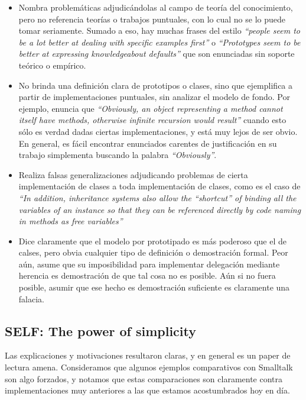 \documentclass[a4paper,10pt]{article}
\begin{document}
\begin{itemize}
	\item Nombra problemáticas adjudicándolas al campo de teoría del conocimiento, pero no referencia teorías o trabajos puntuales, con lo cual no se lo puede tomar seriamente. Sumado a eso, hay muchas frases del estilo \textit{``people seem to be a lot better at dealing with specific examples first''} o \textit{``Prototypes seem to be better at expressing knowledgeabout defaults''} que son enunciadas sin soporte teórico o empírico.
	\item No brinda una definición clara de prototipos o clases, sino que ejemplifica a partir de implementaciones puntuales, sin analizar el modelo de fondo. Por ejemplo, enuncia que \textit{``Obviously, an object representing a method cannot itself have methods, otherwise infinite recursion would result''} cuando esto sólo es verdad dadas ciertas implementaciones, y está muy lejos de ser obvio. En general, es fácil encontrar enunciados carentes de justificación en su trabajo simplementa buscando la palabra \textit{``Obviously''}.
  \item Realiza falsas generalizaciones adjudicando problemas de cierta implementación de clases a toda implementación de clases, como es el caso de \textit{``In addition, inheritance systems also allow the “shortcut” of binding all the variables of an instance so that they can be referenced directly by code naming in methods as free variables''}
  \item Dice claramente que el modelo por prototipado es más poderoso que el de calses, pero obvia cualquier tipo de definición o demostración formal. Peor aún, asume que su imposibilidad para implementar delegación mediante herencia es demostración de que tal cosa no es posible. Aún si no fuera posible, asumir que ese hecho es demostración suficiente es claramente una falacia.
\end{itemize}


\subsection{SELF: The power of simplicity}

Las explicaciones y motivaciones resultaron claras, y en general es un paper de lectura amena. Consideramos que algunos ejemplos comparativos con Smalltalk son algo forzados, y notamos que estas comparaciones son claramente contra implementaciones muy anteriores a las que estamos acostumbrados hoy en día.
\end{document}

